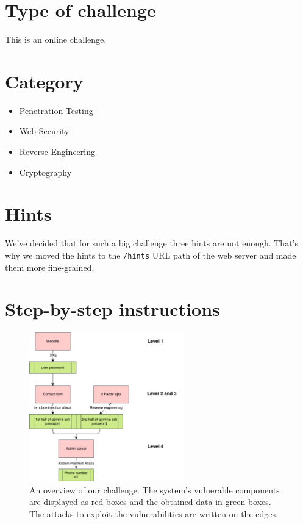 \documentclass[11pt, a4paper]{article}
\begin{document}
\section{Type of challenge}

This is an online challenge.

\section{Category}

\begin{itemize}
  \item Penetration Testing
  \item Web Security
  \item Reverse Engineering
  \item Cryptography
\end{itemize}

\section{Hints}

We've decided that for such a big challenge three hints are not enough. That's
why we moved the hints to the \texttt{/hints} URL path of the web server
and made them more fine-grained.

\section{Step-by-step instructions}\label{sbs}

\begin{figure}
    \begin{center}
    \vspace{-1em}
    \includegraphics[width=0.6\textwidth]{images/diagram}
    \end{center}
    \caption{An overview of our challenge. The system's vulnerable components
    are displayed as red boxes and the obtained data in green boxes. The attacks
    to exploit the vulnerabilities are written on the edges.}
    \label{fig:diag}
\end{figure}
\end{document}
